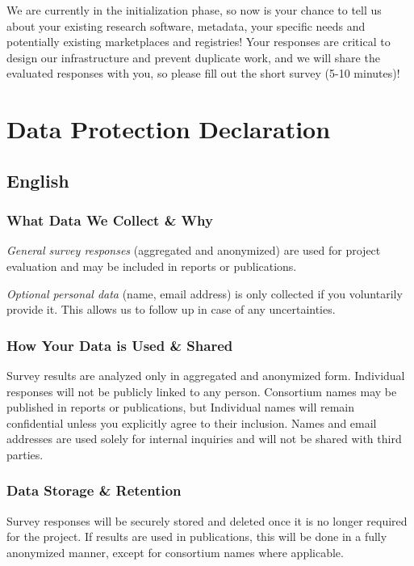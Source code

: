 \documentclass[headsepline,titlepage,twoside,12pt,toc=flat,headings=normal]{scrreprt}
\begin{document}
We are currently in the initialization phase, so now is your chance to tell us about your existing research software, metadata, your specific needs and potentially existing marketplaces and registries!
Your responses are critical to design our infrastructure and prevent duplicate work, and we will share the evaluated responses with you, so please fill out the short survey (5-10 minutes)!

\section{Data Protection Declaration}\label{english-data-protection-declaration}

\subsection{English}

\subsubsection{What Data We Collect \& Why}
\emph{General survey responses} (aggregated and anonymized) are used for project evaluation and may be included in reports or publications.

\emph{Optional personal data} (name, email address) is only collected if you voluntarily provide it.
This allows us to follow up in case of any uncertainties.

\subsubsection{How Your Data is Used \& Shared}
Survey results are analyzed only in aggregated and anonymized form.
Individual responses will not be publicly linked to any person.
Consortium names may be published in reports or publications, but Individual names will remain confidential unless you explicitly agree to their inclusion.
Names and email addresses are used solely for internal inquiries and will not be shared with third parties.

\subsubsection{Data Storage \& Retention}\label{data-storage-retention}
Survey responses will be securely stored and deleted once it is no longer required for the project.
If results are used in publications, this will be done in a fully anonymized manner, except for consortium names where applicable.
\end{document}
